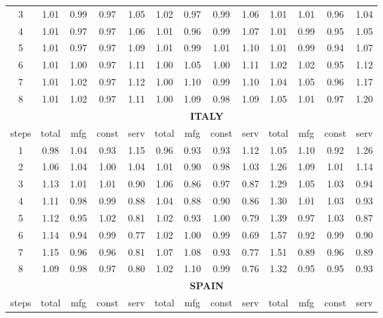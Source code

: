 \documentclass[11pt]{article}
\begin{document}
\begin{appendices}
\begin{table}[htbp]
\begin{tabular}{c|cccc|cccc|cccc}
    3     & 1.01  & 0.99  & 0.97  & 1.05  & 1.02  & 0.97  & 0.99  & 1.06  & 1.01  & 1.01  & 0.96  & 1.04 \\
    4     & 1.01  & 0.97  & 0.97  & 1.06  & 1.01  & 0.96  & 0.99  & 1.07  & 1.01  & 0.99  & 0.95  & 1.05 \\
    5     & 1.01  & 0.97  & 0.97  & 1.09  & 1.01  & 0.99  & 1.01  & 1.10  & 1.01  & 0.99  & 0.94  & 1.07 \\
    6     & 1.01  & 1.00  & 0.97  & 1.11  & 1.00  & 1.05  & 1.00  & 1.11  & 1.02  & 1.02  & 0.95  & 1.12 \\
    7     & 1.01  & 1.02  & 0.97  & 1.12  & 1.00  & 1.10  & 0.99  & 1.10  & 1.04  & 1.05  & 0.96  & 1.17 \\
    8     & 1.01  & 1.02  & 0.97  & 1.11  & 1.00  & 1.09  & 0.98  & 1.09  & 1.05  & 1.01  & 0.97  & 1.20 \\
    \midrule
    \multicolumn{1}{c}{} & \multicolumn{12}{c}{\textbf{ITALY}} \\
    \midrule
    steps & total & mfg   & const & serv  & total & mfg   & const & serv  & total & mfg   & const & serv \\
    \midrule
    1     & 0.98  & 1.04  & 0.93  & 1.15  & 0.96  & 0.93  & 0.93  & 1.12  & 1.05  & 1.10  & 0.92  & 1.26 \\
    2     & 1.06  & 1.04  & 1.00  & 1.04  & 1.01  & 0.90  & 0.98  & 1.03  & 1.26  & 1.09  & 1.01  & 1.14 \\
    3     & 1.13  & 1.01  & 1.01  & 0.90  & 1.06  & 0.86  & 0.97  & 0.87  & 1.29  & 1.05  & 1.03  & 0.94 \\
    4     & 1.11  & 0.98  & 0.99  & 0.88  & 1.04  & 0.88  & 0.90  & 0.86  & 1.30  & 1.01  & 1.03  & 0.93 \\
    5     & 1.12  & 0.95  & 1.02  & 0.81  & 1.02  & 0.93  & 1.00  & 0.79  & 1.39  & 0.97  & 1.03  & 0.87 \\
    6     & 1.14  & 0.94  & 0.99  & 0.77  & 1.02  & 1.00  & 0.99  & 0.69  & 1.57  & 0.92  & 0.99  & 0.90 \\
    7     & 1.15  & 0.96  & 0.96  & 0.81  & 1.07  & 1.08  & 0.93  & 0.77  & 1.51  & 0.89  & 0.96  & 0.89 \\
    8     & 1.09  & 0.98  & 0.97  & 0.80  & 1.02  & 1.10  & 0.99  & 0.76  & 1.32  & 0.95  & 0.95  & 0.93 \\
    \midrule
    \multicolumn{1}{c}{} & \multicolumn{12}{c}{\textbf{SPAIN}} \\
    \midrule
    steps & total & mfg   & const & serv  & total & mfg   & const & serv  & total & mfg   & const & serv \\

\end{tabular}
\end{table}
\end{appendices}
\end{document}
